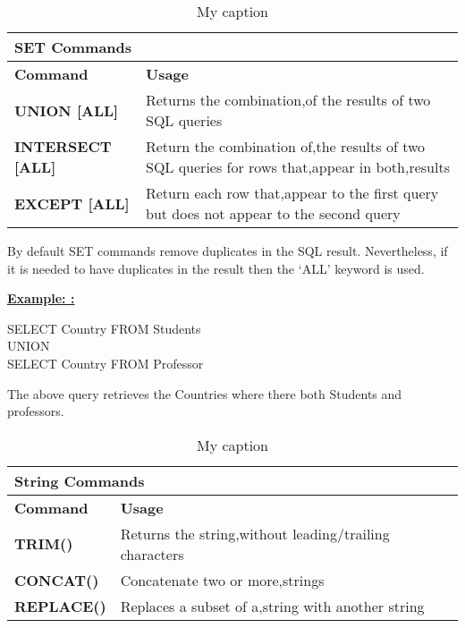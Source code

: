  
\begin{table}[h]
\centering
\caption{My caption}
\label{my-label}
\begin{tabular}{|l|l|}
\hline
\multicolumn{2}{|l|}{\textbf{SET Commands}}                                                                                                                                \\ \hline
\textbf{Command}                                    & \textbf{Usage}                                                                                                       \\ \hline
{\color[HTML]{333333} \textbf{UNION {[}ALL{]}}}     & {\color[HTML]{333333} Returns the combination,of the results of two SQL queries}                                     \\ \hline
{\color[HTML]{333333} \textbf{INTERSECT {[}ALL{]}}} & {\color[HTML]{333333} Return the combination of,the results of two SQL queries for rows that,appear in both,results} \\ \hline
{\color[HTML]{333333} \textbf{EXCEPT {[}ALL{]}}}    & {\color[HTML]{333333} Return each row that,appear to the first query but does not appear to the second query}        \\ \hline
\end{tabular}
\end{table}

By default SET commands remove duplicates in the SQL result. Nevertheless, if it is needed to have duplicates in the result then the ‘ALL’ keyword is used.  


\textbf{\underline{Example: :} }
\begin{mdframed}[backgroundcolor=gray!20][h] 
SELECT Country FROM Students 
\\UNION
\\SELECT Country  FROM  Professor
\end{mdframed}

The above query retrieves the Countries where there both Students and professors. 

 
\begin{table}[]
\centering
\caption{My caption}
\label{my-label}
\begin{tabular}{|l|l|}
\hline
\multicolumn{2}{|l|}{\textbf{String Commands}}                                                                            \\ \hline
\textbf{Command}                          & \textbf{Usage}                                                                \\ \hline
{\color[HTML]{333333} \textbf{TRIM()}}    & {\color[HTML]{333333} Returns the string,without leading/trailing characters} \\ \hline
{\color[HTML]{333333} \textbf{CONCAT()}}  & {\color[HTML]{333333} Concatenate two or more,strings}                        \\ \hline
{\color[HTML]{333333} \textbf{REPLACE()}} & {\color[HTML]{333333} Replaces a subset of a,string with another string}      \\ \hline
\end{tabular}
\end{table}


